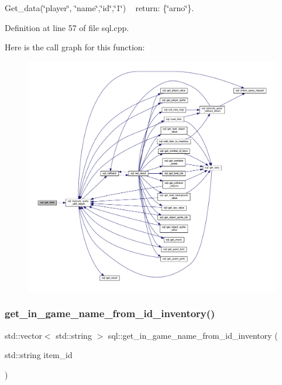 Get\+\_\+data(\char`\"{}player\char`\"{}, \char`\"{}name\char`\"{},\char`\"{}id\char`\"{},\char`\"{}1\char`\"{}) ~\newline
return\+: \{\char`\"{}arno\char`\"{}\}. 

Definition at line 57 of file sql.\+cpp.

Here is the call graph for this function\+:
\nopagebreak
\begin{figure}[H]
\begin{center}
\leavevmode
\includegraphics[width=350pt]{classsql_afbf7d36239ee07a23d06c72f2fd1b93c_cgraph}
\end{center}
\end{figure}
\mbox{\label{classsql_a62cd4910a9310621ca22fb3c322f52a4}} 
\subsubsection{\texorpdfstring{get\+\_\+in\+\_\+game\+\_\+name\+\_\+from\+\_\+id\+\_\+inventory()}{get\_in\_game\_name\_from\_id\_inventory()}}
{\footnotesize\ttfamily std\+::vector$<$ std\+::string $>$ sql\+::get\+\_\+in\+\_\+game\+\_\+name\+\_\+from\+\_\+id\+\_\+inventory (\begin{DoxyParamCaption}\item[{std\+::string}]{item\+\_\+id }\end{DoxyParamCaption})}



